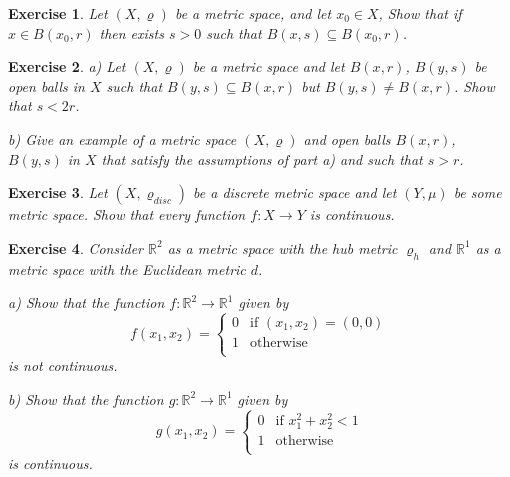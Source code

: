 \documentclass[11pt, letterpaper, oneside]{report}
\theoremstyle{pplain}
\newtheorem{ITERMVALUE THM}[theorem]{Intermediate Value Theorem}
\newtheorem{HEINEBOREL THM}[theorem]{Heine-Borel Theorem}
\newtheorem{UMETR THM}[theorem]{Urysohn Metrization Theorem}
\newtheorem{UMETR2 THM}[theorem]{Urysohn Metrization Theorem (v.2)}
\theoremstyle{ddefinition}
\theoremstyle{nnn}
\newtheorem{TDA NN}[theorem]{Topological Data Analysis. }
\theoremstyle{eexercise}
\newtheorem{exercise}{Exercise}[chapter]
\newcommand{\R}{{\mathbb R}}
\begin{document}
\begin{exercise}
\label{BALLINBALL EXERCISE}
Let $(X, \varrho)$ be a metric space,  and let $x_{0}\in X$, Show that if $x\in B(x_{0}, r)$ then 
exists $s>0$ such that $B(x, s)\subseteq B(x_{0}, r)$.
\end{exercise} 




\begin{exercise}
a) Let $(X, \varrho)$ be a metric space and let $B(x, r)$, $B(y, s)$ be open balls in $X$ such that 
$B(y, s) \subseteq B(x, r)$ but $B(y, s) \neq B(x, r)$. Show that $s < 2r$. 


b) Give an example of a metric space $(X, \varrho)$ and open balls $B(x, r)$, $B(y, s)$ in $X$ that 
satisfy the assumptions of part a) and such that $s > r$. 
\end{exercise}





\begin{exercise} 
Let $(X, \varrho_{disc})$ be a discrete metric space and let 
$(Y, \mu)$ be some  metric space. Show that every function $f\colon X\to Y$
is continuous. 
\end{exercise}




\begin{exercise}
Consider  $\R^{2}$ as a metric space with the hub metric $\varrho_{h}$ and
$\R^{1}$ as a metric space with the Euclidean metric $d$. 

a) Show that the function $f\colon \R^{2}\to \R^{1}$ given by 
$$
f(x_{1}, x_{2}) = 
\begin{cases}
0 & \text{if } (x_{1}, x_{2}) = (0, 0) \\
1 & \text{otherwise} \\
\end{cases}
$$
is not continuous. 


b) Show that the function $g\colon \R^{2}\to \R^{1}$ given by 
$$
g(x_{1}, x_{2}) = 
\begin{cases}
0 & \text{if }  x_{1}^{2}+x_{2}^{2} < 1 \\
1 & \text{otherwise} \\
\end{cases}
$$
is continuous. 
\end{exercise}






\end{document}
